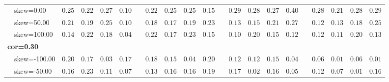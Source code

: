 \begin{table}[!tbp]
\begin{center}
\begin{tabular}{lrrrrcrrrrcrrrrcrrrr}
   ~~skew=0.00&\cellcolor[gray]{0.47}   $0.25$&\cellcolor[gray]{0.47}   $0.22$&\cellcolor[gray]{0.47}   $0.27$&\cellcolor[gray]{1}   $0.10$&   &\cellcolor[gray]{0.47}   $0.22$&\cellcolor[gray]{0.47}   $0.25$&\cellcolor[gray]{0.47}   $0.25$&\cellcolor[gray]{0.73}   $0.15$&   &\cellcolor[gray]{0.47}   $0.29$&\cellcolor[gray]{0.47}   $0.28$&\cellcolor[gray]{0.47}   $ 0.27$&\cellcolor[gray]{0.2}   $ 0.40$&   &\cellcolor[gray]{0.47}   $0.28$&\cellcolor[gray]{0.47}   $0.21$&\cellcolor[gray]{0.47}   $ 0.28$&\cellcolor[gray]{0.47}   $ 0.29$\tabularnewline
   ~~skew=50.00&\cellcolor[gray]{0.47}   $0.21$&\cellcolor[gray]{0.73}   $0.19$&\cellcolor[gray]{0.47}   $0.25$&\cellcolor[gray]{1}   $0.10$&   &\cellcolor[gray]{0.73}   $0.18$&\cellcolor[gray]{0.73}   $0.17$&\cellcolor[gray]{0.73}   $0.19$&\cellcolor[gray]{0.47}   $0.23$&   &\cellcolor[gray]{0.73}   $0.13$&\cellcolor[gray]{0.73}   $0.15$&\cellcolor[gray]{0.47}   $ 0.21$&\cellcolor[gray]{0.47}   $ 0.27$&   &\cellcolor[gray]{0.73}   $0.12$&\cellcolor[gray]{0.73}   $0.13$&\cellcolor[gray]{0.73}   $ 0.18$&\cellcolor[gray]{0.47}   $ 0.25$\tabularnewline
   ~~skew=100.00&\cellcolor[gray]{0.73}   $0.14$&\cellcolor[gray]{0.47}   $0.22$&\cellcolor[gray]{0.73}   $0.18$&\cellcolor[gray]{1}   $0.04$&   &\cellcolor[gray]{0.47}   $0.22$&\cellcolor[gray]{0.73}   $0.17$&\cellcolor[gray]{0.47}   $0.23$&\cellcolor[gray]{0.73}   $0.15$&   &\cellcolor[gray]{1}   $0.10$&\cellcolor[gray]{0.73}   $0.20$&\cellcolor[gray]{0.73}   $ 0.15$&\cellcolor[gray]{0.73}   $ 0.12$&   &\cellcolor[gray]{0.73}   $0.12$&\cellcolor[gray]{0.73}   $0.11$&\cellcolor[gray]{0.73}   $ 0.20$&\cellcolor[gray]{0.73}   $ 0.13$\tabularnewline
\hline
{\bfseries cor=0.30}&&&&&&&&&&&&&&&&&&&\tabularnewline
   ~~skew=-100.00&\cellcolor[gray]{0.73}   $0.20$&\cellcolor[gray]{0.73}   $0.17$&\cellcolor[gray]{1}   $0.03$&\cellcolor[gray]{0.73}   $0.17$&   &\cellcolor[gray]{0.73}   $0.18$&\cellcolor[gray]{0.73}   $0.15$&\cellcolor[gray]{1}   $0.04$&\cellcolor[gray]{0.73}   $0.20$&   &\cellcolor[gray]{0.73}   $0.12$&\cellcolor[gray]{0.73}   $0.12$&\cellcolor[gray]{0.73}   $ 0.15$&\cellcolor[gray]{1}   $ 0.04$&   &\cellcolor[gray]{1}   $0.06$&\cellcolor[gray]{1}   $0.01$&\cellcolor[gray]{1}   $ 0.06$&\cellcolor[gray]{1}   $ 0.01$\tabularnewline
   ~~skew=-50.00&\cellcolor[gray]{0.73}   $0.16$&\cellcolor[gray]{0.47}   $0.23$&\cellcolor[gray]{1}   $0.11$&\cellcolor[gray]{1}   $0.07$&   &\cellcolor[gray]{0.73}   $0.13$&\cellcolor[gray]{0.73}   $0.16$&\cellcolor[gray]{0.73}   $0.16$&\cellcolor[gray]{0.73}   $0.19$&   &\cellcolor[gray]{0.73}   $0.17$&\cellcolor[gray]{1}   $0.02$&\cellcolor[gray]{0.73}   $ 0.16$&\cellcolor[gray]{1}   $ 0.05$&   &\cellcolor[gray]{0.73}   $0.12$&\cellcolor[gray]{1}   $0.07$&\cellcolor[gray]{1}   $ 0.01$&\cellcolor[gray]{0.73}   $ 0.16$\tabularnewline

\end{tabular}
\end{center}
\end{table}
